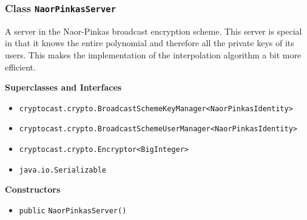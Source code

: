 \subsubsection{Class \lstinline|NaorPinkasServer|}
A server in the Naor-Pinkas broadcast encryption scheme. This server is special in that it knows
 the entire polynomial and therefore all the private keys of its users. This makes the implementation
 of the interpolation algorithm a bit more efficient. \\



\textbf{Superclasses and Interfaces}
\begin{itemize}
\item \lstinline|cryptocast.crypto.BroadcastSchemeKeyManager<NaorPinkasIdentity>|
\item \lstinline|cryptocast.crypto.BroadcastSchemeUserManager<NaorPinkasIdentity>|
\item \lstinline|cryptocast.crypto.Encryptor<BigInteger>|
\item \lstinline|java.io.Serializable|
\end{itemize}



\textbf{Constructors}
\begin{itemize}
\item \lstinline|public| \lstinline|NaorPinkasServer|\lstinline|()|




\end{itemize}


